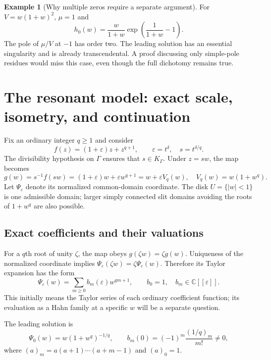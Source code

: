 \documentclass[11pt,a4paper]{article}
\numberwithin{equation}{section}
\theoremstyle{definition}
\newtheorem{example}[theorem]{Example}
\theoremstyle{remark}
\newcommand{\C}{\mathbb C}
\newcommand{\K}{K_\Gamma}
\newcommand{\eps}{\varepsilon}
\begin{document}
\begin{example}[Why multiple zeros require a separate argument]
For $V=w(1+w)^2$, $\mu=1$ and
\[
 h_0(w)=\frac{w}{1+w}\exp\!\left(\frac1{1+w}-1\right).
\]
The pole of $\mu/V$ at $-1$ has order two.  The leading solution has an
essential singularity and is already transcendental.  A proof discussing
only simple-pole residues would miss this case, even though the full
dichotomy remains true.
\end{example}

\section{The resonant model: exact scale, isometry, and continuation}
\label{sec:model}

Fix an ordinary integer $q\ge1$ and consider
\[
 f(z)=(1+\eps)z+z^{q+1},\qquad
 \eps=t^\delta,\quad s=t^{\delta/q}.
\]
The divisibility hypothesis on $\Gamma$ ensures that $s\in\K$.
Under $z=sw$, the map becomes
\begin{equation}\label{eq:gmodel}
 g(w)=s^{-1}f(sw)=(1+\eps)w+\eps w^{q+1}
              =w+\eps V_q(w),\quad V_q(w)=w(1+w^q).
\end{equation}
Let $\Psi_\eps$ denote its normalized common-domain coordinate.
The disk $U=\{|w|<1\}$ is one admissible domain; larger simply connected
slit domains avoiding the roots of $1+w^q$ are also possible.

\subsection{Exact coefficients and their valuations}

For a $q$th root of unity $\zeta$, the map obeys
$g(\zeta w)=\zeta g(w)$.  Uniqueness of the normalized coordinate implies
$\Psi_\eps(\zeta w)=\zeta\Psi_\eps(w)$.  Therefore its Taylor expansion has
the form
\begin{equation}\label{eq:bseries}
 \Psi_\eps(w)=\sum_{m\ge0}b_m(\eps)w^{qm+1},
 \qquad b_0=1,\quad b_m\in\C[[\eps]].
\end{equation}
This initially means the Taylor series of each ordinary coefficient
function; its evaluation as a Hahn family at a specific $w$ will be a
separate question.

The leading solution is
\begin{equation}\label{eq:leadingmodel}
 \Psi_0(w)=w(1+w^q)^{-1/q},
 \qquad
 b_m(0)=(-1)^m\frac{(1/q)_m}{m!}\ne0,
\end{equation}
where $(a)_m=a(a+1)\cdots(a+m-1)$ and $(a)_0=1$.
\end{document}
